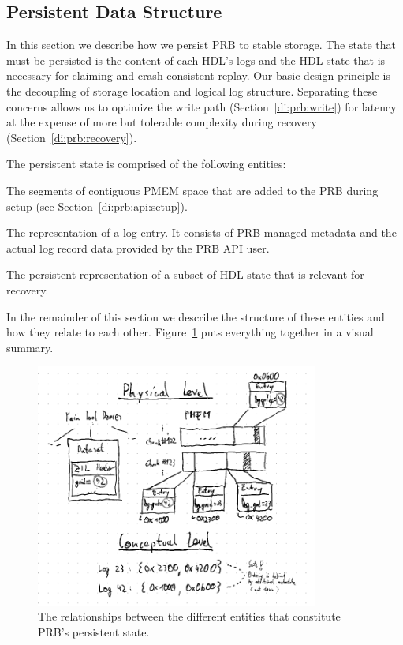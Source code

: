 \documentclass[12pt,a4paper,twoside]{book}
\begin{document}
\subsection{Persistent Data Structure}\label{di:prb:persistent}
In this section we describe how we persist PRB to stable storage.
The state that must be persisted is the content of each HDL's logs and the HDL state that is necessary for claiming and crash-consistent replay.
Our basic design principle is the decoupling of storage location and logical log structure.
Separating these concerns allows us to optimize the write path (Section~\ref{di:prb:write}) for latency at the expense of more but tolerable complexity during recovery (Section~\ref{di:prb:recovery}).

The persistent state is comprised of the following entities:
\begin{description}[noitemsep,leftmargin=1.5cm,labelindent=1cm]
    \item[PMEM chunks] The segments of contiguous PMEM space that are added to the PRB during setup (see Section~\ref{di:prb:api:setup}).
    \item[Entry] The representation of a log entry. It consists of PRB-managed metadata and the actual log record data provided by the PRB API user.
    \item[ZIL Header] The persistent representation of a subset of HDL state that is relevant for recovery.
\end{description}
In the remainder of this section we describe the structure of these entities and how they relate to each other.
Figure~\ref{fig:prb_physical_data_structure_entities} puts everything together in a visual summary.

\begin{figure}
    \centering
    \includegraphics[height=8cm]{fig/prb_physical_data_structure_entities}
    \caption{
        The relationships between the different entities that constitute PRB's persistent state.
    }
    \label{fig:prb_physical_data_structure_entities}
\end{figure}
\end{document}
